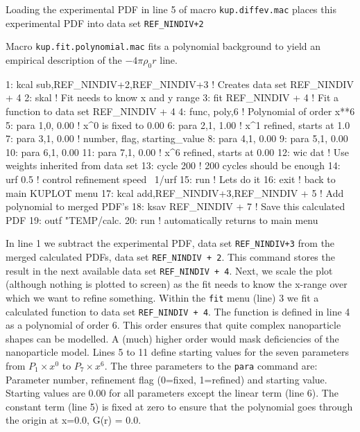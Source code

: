 Loading the experimental PDF in line 5 of macro {\tt kup.diffev.mac} 
places this experimental PDF into data set {\tt REF\_NINDIV+2}

Macro {\tt kup.fit.polynomial.mac} 
fits a polynomial background to yield an empirical description of the
$-4 \pi \rho_0 r$ line.

\begin{MacVerbatim}
 1: kcal sub,REF_NINDIV+2,REF_NINDIV+3 ! Creates data set REF_NINDIV + 4
 2: skal                      ! Fit needs to know x and y range
 3: fit REF_NINDIV + 4        ! Fit a function to data set REF_NINDIV + 4
 4:   func, poly,6            ! Polynomial of order x**6
 5:   para 1,0, 0.00          ! x^0 is fixed to 0.00
 6:   para 2,1, 1.00          ! x^1 refined, starts at 1.0
 7:   para 3,1, 0.00          ! number, flag, starting_value
 8:   para 4,1, 0.00
 9:   para 5,1, 0.00
10:   para 6,1, 0.00
11:   para 7,1, 0.00          ! x^6 refined, starts at 0.00
12:   wic  dat                ! Use weights inherited from data set
13:   cycle 200               ! 200 cycles should be enough
14:   urf 0.5                 ! control refinement speed ~1/urf
15:   run                     ! Lets do it
16: exit                      ! back to main KUPLOT menu
17: kcal add,REF_NINDIV+3,REF_NINDIV + 5 ! Add polynomial to merged PDF's
18: ksav REF_NINDIV + 7           ! Save this calculated PDF 
19:    outf "TEMP/calc.%
20:    run                    ! automatically returns to main menu
\end{MacVerbatim}

In line 1 we subtract the experimental PDF, data set {\tt REF\_NINDIV+3}
from the merged calculated PDFs, data set {\tt REF\_NINDIV + 2}. This
command stores the result in the next available data set 
{\tt REF\_NINDIV + 4}.
Next, we scale the plot (although nothing is plotted to screen) as the 
fit needs to know the x-range over which we want to refine something.
Within the {\tt fit} menu (line) 3 we fit a calculated function to data set 
{\tt REF\_NINDIV + 4}. The function is defined in line 4 as a polynomial
of order 6. This order ensures that quite complex nanoparticle shapes
can be modelled. A (much) higher order would mask deficiencies of the 
nanoparticle model. 
Lines 5 to 11 define starting values for the seven parameters
from $P_1 \times x^0$ to $P_7 \times x^6$. 
The three parameters to the {\tt para} command are: Parameter number, 
refinement flag (0=fixed, 1=refined) and starting value.
Starting values are 0.00 for all parameters except the linear term (line 6). 
The constant term (line 5) is fixed at zero to ensure that the polynomial
goes through the origin at x=0.0, G(r) = 0.0.

